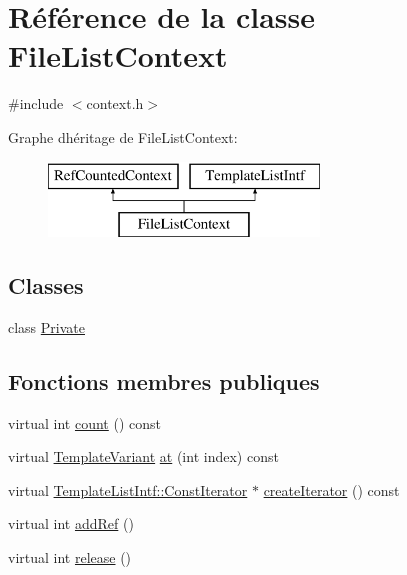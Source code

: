 \hypertarget{class_file_list_context}{}\section{Référence de la classe File\+List\+Context}
\label{class_file_list_context}


{\ttfamily \#include $<$context.\+h$>$}

Graphe d\textquotesingle{}héritage de File\+List\+Context\+:\begin{figure}[H]
\begin{center}
\leavevmode
\includegraphics[height=2.000000cm]{class_file_list_context}
\end{center}
\end{figure}
\subsection*{Classes}
\begin{DoxyCompactItemize}
\item 
class \hyperlink{class_file_list_context_1_1_private}{Private}
\end{DoxyCompactItemize}
\subsection*{Fonctions membres publiques}
\begin{DoxyCompactItemize}
\item 
virtual int \hyperlink{class_file_list_context_afd8e996fc26cf38e92bbfbbe1e921e55}{count} () const 
\item 
virtual \hyperlink{class_template_variant}{Template\+Variant} \hyperlink{class_file_list_context_a92f515348d28f41f94e3f1b305dfa348}{at} (int index) const 
\item 
virtual \hyperlink{class_template_list_intf_1_1_const_iterator}{Template\+List\+Intf\+::\+Const\+Iterator} $\ast$ \hyperlink{class_file_list_context_adf3f7a41ceaf0f7471adca0309b790b5}{create\+Iterator} () const 
\item 
virtual int \hyperlink{class_file_list_context_a8b193daaaccb88cee19db52c368d727a}{add\+Ref} ()
\item 
virtual int \hyperlink{class_file_list_context_a757f759e1158e2c2859cb86b483fcd51}{release} ()
\end{DoxyCompactItemize}
